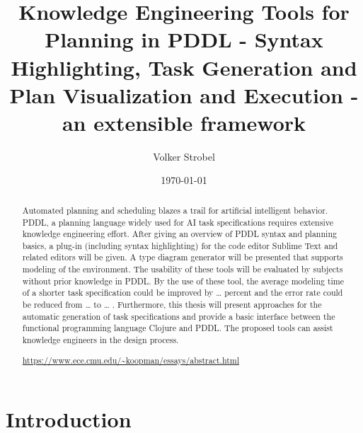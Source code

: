 \documentclass[11pt]{report}
\author{Volker Strobel}
\date{\today}
\title{Knowledge Engineering Tools for Planning in PDDL - Syntax Highlighting, Task Generation and Plan Visualization and Execution - an extensible framework}
\begin{document}
\maketitle
\tableofcontents

\begin{abstract}
Automated planning and scheduling blazes a trail for artificial
intelligent behavior. PDDL, a planning language widely used for AI
task specifications requires extensive knowledge engineering effort.
After giving an overview of PDDL syntax and planning basics, a plug-in
(including syntax highlighting) for the code editor Sublime Text and
related editors will be given. A type diagram generator will be
presented that supports modeling of the environment. The usability of
these tools will be evaluated by subjects without prior knowledge in
PDDL. By the use of these tool, the average modeling time of a shorter
task specification could be improved by \ldots{} percent and the error rate
could be reduced from \ldots{} to \ldots{} . Furthermore, this thesis will
present approaches for the automatic generation of task specifications
and provide a basic interface between the functional programming
language Clojure and PDDL. The proposed tools can assist knowledge
engineers in the design process.

\url{https://www.ece.cmu.edu/~koopman/essays/abstract.html}
\end{abstract}
\chapter{Introduction}
\label{sec-1}
\begin{center}
\end{center}
\end{document}
